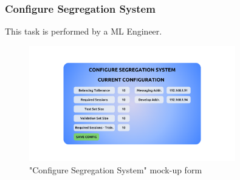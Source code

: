 \subsubsection{Configure Segregation System}

This task is performed by a ML Engineer.

\begin{figure}[H]
\centering
\includegraphics[width=0.8\textwidth]{figures/ui_configure_segregation.png}
\caption{"Configure Segregation System" mock-up form}
\end{figure}

